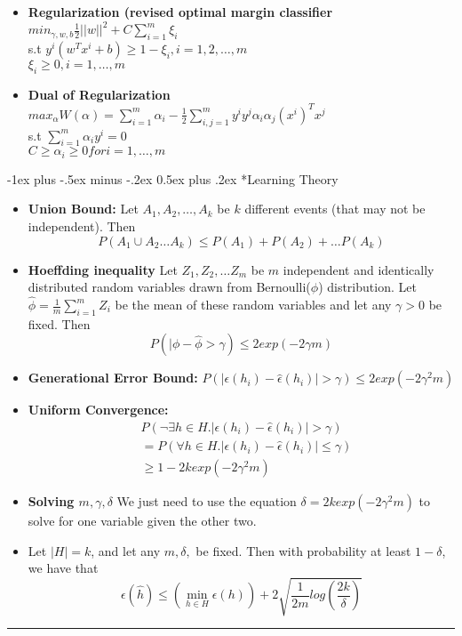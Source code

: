 \documentclass[10pt,landscape]{article}
\makeatletter
\renewcommand{\section}{\@startsection{section}{1}{0mm}%
                                {-1ex plus -.5ex minus -.2ex}%
                                {0.5ex plus .2ex}%
                                {\normalfont\large\bfseries}}
\makeatother
\begin{document}
\begin{multicols}{3}
\begin{itemize}
\item \textbf{Regularization (revised optimal margin classifier}\\$min_{\gamma, w, b} \frac{1}{2} ||w||^2 + C\sum_{i = 1}^{m}\xi_i $\\
s.t $y^i(w^Tx^i +b) \geq 1-\xi_i, i = 1, 2, \dots, m$ \\
$\xi_i \geq 0, i = 1, \dots, m$\\
\item \textbf{Dual of Regularization} \\
$max_\alpha W(\alpha) = \sum_{i = 1}^{m}\alpha_i - \frac{1}{2}\sum_{i, j = 1}^{m}y^i y^j \alpha_i \alpha_j (x^i)^Tx^j$\\
s.t $\sum_{i = 1}^{m}\alpha_i y^i = 0$\\
$C \geq \alpha_i \geq 0 for i = 1, \dots, m$
\end{itemize}
\section*{Learning Theory}
\begin{itemize}
\item \textbf{Union Bound:} Let $A_1, A_2, \dots, A_k$ be $k$ different events (that may not be independent). Then 
$$P(A_1 \cup A_2\dots A_k) \leq P(A_1) + P(A_2) + \dots P(A_k)$$
\item \textbf{Hoeffding inequality} Let $Z_1, Z_2, \dots Z_m$ be $m$ independent and identically distributed random variables drawn from Bernoulli($\phi$) distribution. Let $\hat{\phi}  = \frac{1}{m}\sum_{i = 1}^{m}Z_i$ be the mean of these random variables and let any $\gamma >0$ be fixed. Then 
$$P(|\phi - \hat{\phi}>\gamma ) \leq 2exp(-2\gamma m)$$
\item \textbf{Generational Error Bound:} $P(|\epsilon(h_i) - \hat{\epsilon}(h_i)| > \gamma) \leq 2exp(-2\gamma^2m)$
\item \textbf{Uniform Convergence:} \\
\begin{align*}
&P(\neg \exists h \in H. |\epsilon(h_i) - \hat{\epsilon}(h_i)| > \gamma) \\
&= P(\forall h \in H. |\epsilon(h_i) - \hat{\epsilon}(h_i)| \leq \gamma)\\
& \geq 1- 2k exp(-2\gamma^2m)
\end{align*}

\item \textbf{Solving $m, \gamma, \delta$} We just need to use the equation $\delta = 2k exp(-2\gamma^2m)$ to solve for one variable given the other two. 
\item  Let $|H| = k$, and let any $m, \delta,$ be fixed. Then with probability at least $ 1-\delta$, we have that 
$$
\epsilon(\hat{h})  \leq (\min_{h \in H} \epsilon(h)) + 2\sqrt{\frac{1}{2m} log(\frac{2k}{\delta})}
$$
\end{itemize}
\rule{0.3\linewidth}{0.25pt}
\scriptsize


\end{multicols}
\end{document}
